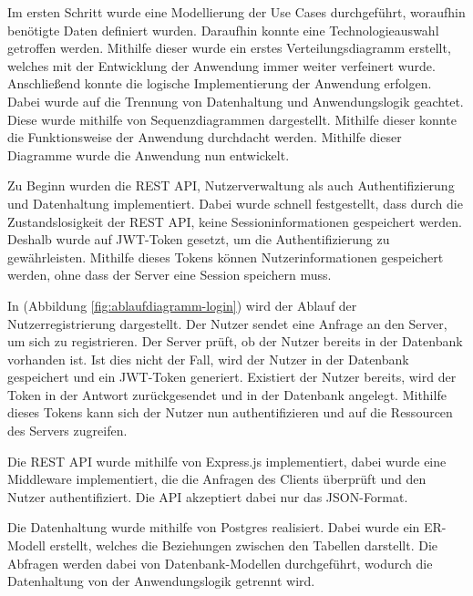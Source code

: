 \documentclass[
]{article}
\begin{document}
Im ersten Schritt wurde eine Modellierung der Use Cases durchgeführt, woraufhin benötigte Daten definiert wurden.
Daraufhin konnte eine Technologieauswahl getroffen werden. Mithilfe dieser wurde ein erstes Verteilungsdiagramm erstellt,
welches mit der Entwicklung der Anwendung immer weiter verfeinert wurde. Anschließend konnte die logische Implementierung
der Anwendung erfolgen. Dabei wurde auf die Trennung von Datenhaltung und Anwendungslogik geachtet.
Diese wurde mithilfe von Sequenzdiagrammen dargestellt. Mithilfe dieser konnte die Funktionsweise der Anwendung
durchdacht werden. Mithilfe dieser Diagramme wurde die Anwendung nun entwickelt.

Zu Beginn wurden die REST API, Nutzerverwaltung als auch Authentifizierung und Datenhaltung implementiert.
Dabei wurde schnell festgestellt, dass durch die Zustandslosigkeit der REST API,
keine Sessioninformationen gespeichert werden. Deshalb wurde auf JWT-Token gesetzt, um die Authentifizierung
zu gewährleisten. Mithilfe dieses Tokens können Nutzerinformationen gespeichert werden, ohne dass der Server
eine Session speichern muss. 

In (Abbildung \ref{fig:ablaufdiagramm-login}) wird der Ablauf der Nutzerregistrierung dargestellt.
Der Nutzer sendet eine Anfrage an den Server, um sich zu registrieren. Der Server prüft, ob der Nutzer bereits
in der Datenbank vorhanden ist. Ist dies nicht der Fall, wird der Nutzer in der Datenbank gespeichert und ein JWT-Token generiert.
Existiert der Nutzer bereits, wird der Token in der Antwort zurückgesendet und in der Datenbank angelegt.
Mithilfe dieses Tokens kann sich der Nutzer nun authentifizieren und auf die Ressourcen des Servers zugreifen.

Die REST API wurde mithilfe von Express.js implementiert, dabei wurde eine Middleware implementiert, die die Anfragen des Clients
überprüft und den Nutzer authentifiziert. Die API akzeptiert dabei nur das JSON-Format.

Die Datenhaltung wurde mithilfe von Postgres realisiert. Dabei wurde ein ER-Modell erstellt, welches die Beziehungen
zwischen den Tabellen darstellt. Die Abfragen werden dabei von Datenbank-Modellen durchgeführt, wodurch die Datenhaltung
von der Anwendungslogik getrennt wird. 
\end{document}
